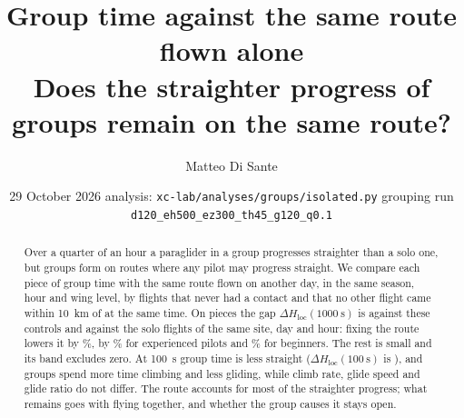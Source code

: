 \documentclass[10pt,a4paper]{article}
\title{\textbf{Group time against the same route flown alone}\\[2pt]
  \large Does the straighter progress of groups remain on the same route?}
\author{Matteo Di Sante}
\date{29 October 2026 \;\textbullet\; analysis: \texttt{xc-lab/analyses/groups/isolated.py} \;\textbullet\;
  grouping run \texttt{d120\_eh500\_ez300\_th45\_g120\_q0.1}}
\newcommand{\Hloc}{H_\mathrm{loc}}
\begin{document}
\maketitle

\begin{abstract}
\noindent
Over a quarter of an hour a paraglider in a group progresses straighter than a solo one, but groups
form on routes where any pilot may progress straight. We compare each piece of group time with the
same route flown on another day, in the same season, hour and wing level, by flights that never had
a contact and that no other flight came within 10~km of at the same time. On \IsoPieces{} pieces the
gap $\Delta\Hloc(1000~\mathrm{s})$ is \IsoDHloc{} \IsoDHlocBand{} against these controls and
\IsoBaseDHloc{} against the solo flights of the same site, day and hour: fixing the route lowers it by
\IsoExplained\%, by \IsoExplainedExp\% for experienced pilots and \IsoExplainedBeg\% for beginners.
The rest is small and its band excludes zero. At 100~s group time is less straight ($\Delta\Hloc(100~\mathrm{s})$ is \IsoDHlocHundred),
and groups spend more time climbing and less gliding, while climb rate, glide speed and glide ratio do not
differ. The route accounts for most of the straighter progress; what remains goes with flying together,
and whether the group causes it stays open.
\end{abstract}







\end{document}
